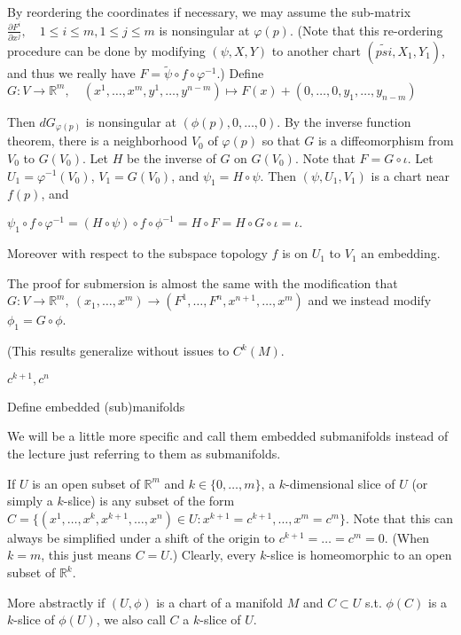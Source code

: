 By reordering the coordinates if necessary, we may assume the sub-matrix
\(\frac{\partial F^i}{\partial x^j}, \quad 1 \leq i \leq m, 1 \leq j \leq m\)
is nonsingular at \(\varphi(p)\). (Note that this re-ordering procedure can be done by modifying \((\psi, X, Y)\) to another chart \((\tilde{psi}, X_1, Y_1)\), and thus we really have \(F = \tilde{\psi} \circ f \circ \varphi^{-1}\).) Define
\(G : V \to \mathbb{R}^m, \quad (x^1, \dots, x^m, y^1, \dots, y^{n-m}) \mapsto F(x) + (0, \dots, 0, y_1, \dots, y_{n-m})\)

Then \(dG_{\varphi(p)}\) is nonsingular at \( (\phi(p), 0, \dots, 0) \). By the inverse function theorem, there is a neighborhood \(V_0\) of \(\varphi(p)\) so that \(G\) is a diffeomorphism from \(V_0\) to \(G(V_0)\). Let \(H\) be the inverse of \(G\) on \(G(V_0)\). Note that \(F = G \circ \iota \). Let \(U_1 = \varphi^{-1}(V_0)\), \(V_1 = G(V_0)\), and \(\psi_1 = H \circ \psi \). Then \((\psi, U_1, V_1)\) is a chart near \(f(p)\), and

\(\psi_1 \circ f \circ \varphi^{-1} = (H\circ \psi) \circ f \circ \phi^{-1} = H \circ F = H \circ G \circ \iota = \iota.\)

Moreover with respect to the subspace topology \( f \) is on \( U_1 \) to \( V_1 \) an embedding.

The proof for submersion is almost the same with the modification that \( G : V \to \mathbb{R}^m,\ (x_1, \dots, x^m) \to (F^1, \dots, F^n, x^{n+1}, \dots, x^m) \)
and we instead modify \( \phi_1 = G \circ \phi \).

(This results generalize without issues to \( C^k(M) \).

\( c^{k+1}, c^n \)

Define embedded (sub)manifolds

We will be a little more specific and call them embedded submanifolds instead of the lecture just referring to them as submanifolds.

If \(U\) is an open subset of \(\mathbb{R}^m\) and \(k \in \{0, \dots, m\}\), a \(k\)-dimensional slice of \(U\) (or simply a \(k\)-slice) is any subset of the form 
\(C = \{(x^1, \dots, x^k, x^{k+1}, \dots, x^n) \in U : x^{k+1} = c^{k+1}, \dots, x^m = c^m\}\). 
Note that this can always be simplified under a shift of the origin to \( c^{k+1} = \dots = c^m = 0 \).
(When \(k = m\), this just means \(C = U\).) Clearly, every \(k\)-slice is homeomorphic to an open subset of \(\mathbb{R}^k\). 

More abstractly if \( (U, \phi) \) is a chart of a manifold \( M \) and \( C \subset U \) s.t. \( \phi(C) \) is a \( k \)-slice of \( \phi(U) \), 
we also call \( C \) a \( k \)-slice of \( U \).

